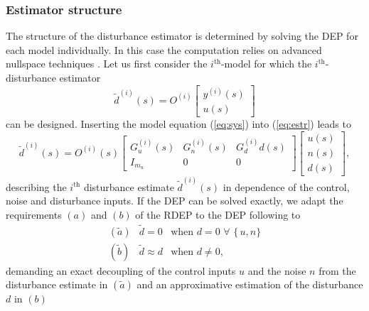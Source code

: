 \documentclass[graybox]{svmult}
\begin{document}
\subsubsection{Estimator structure}\label{sec:strc}
The structure of the disturbance estimator is determined by solving the DEP \cite{Ossmann18ccta} for each model individually. In this case the computation relies on advanced nullspace techniques \cite{Varga17}. Let us first consider the $i^{\text{th}}$-model  for which the  $i^{\text{th}}$- disturbance  estimator 
\begin{equation}\label{eq:estr}
\tilde d^{(i)}(s) =  O^{(i)}
\begin{bmatrix}
y^{(i)}(s) \\ u(s)
\end{bmatrix}
\end{equation}
can be designed.
Inserting the  model equation (\ref{eq:sys})  into (\ref{eq:estr}) leads to
\begin{equation}\label{eq:full}
\tilde d^{(i)}(s) = O^{(i)}(s) 
\begin{bmatrix}
G_u^{(i)}(s) & G_{n}^{(i)}(s) & G_d^{(i)}d(s) \\ I_{m_u}& 0 & 0
\end{bmatrix}
\begin{bmatrix}
u(s) \\ n(s) \\ d(s)
\end{bmatrix},
\end{equation}
describing the  $i^{\text{th}}$ disturbance estimate $\tilde d^{(i)}(s)$ in dependence of the control, noise and disturbance inputs.  If the DEP can be solved exactly, we adapt the requirements $(a)$ and $(b)$ of the RDEP to the DEP following \cite{Ossmann18ccta} to
\begin{equation}
\begin{array}{lll}
(\tilde a) & \tilde d = 0 & \text{when } d = 0  \,\, \forall  \,\, \{\, u, n \}\\ 
(\tilde b) &\tilde d \approx d & \text{when } d \neq 0, 
\end{array}
\end{equation}
demanding an exact decoupling of the control inputs $u$ and the noise $n$ from the disturbance estimate in $(\tilde a)$ and an approximative estimation of the disturbance $d$ in $(b)$ 
\end{document}
